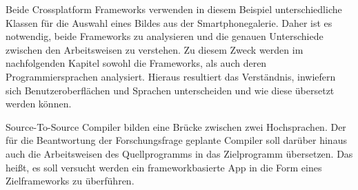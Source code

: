



Beide Crossplatform Frameworks verwenden in diesem Beispiel unterschiedliche Klassen für die Auswahl eines Bildes aus der Smartphonegalerie.  Daher ist es notwendig,  beide Frameworks zu analysieren und die genauen Unterschiede zwischen den Arbeitsweisen zu verstehen.  Zu diesem Zweck werden im nachfolgenden Kapitel sowohl die Frameworks, als auch deren Programmiersprachen analysiert.  Hieraus resultiert das Verständnis, inwiefern sich Benutzeroberflächen und Sprachen unterscheiden und wie diese übersetzt werden können.

Source-To-Source Compiler bilden eine Brücke zwischen zwei Hochsprachen.  Der für die Beantwortung der Forschungsfrage geplante Compiler soll darüber hinaus auch die Arbeitsweisen des Quellprogramms in das Zielprogramm übersetzen.  Das heißt, es soll versucht werden ein frameworkbasierte App in die Form eines Zielframeworks zu überführen. 




